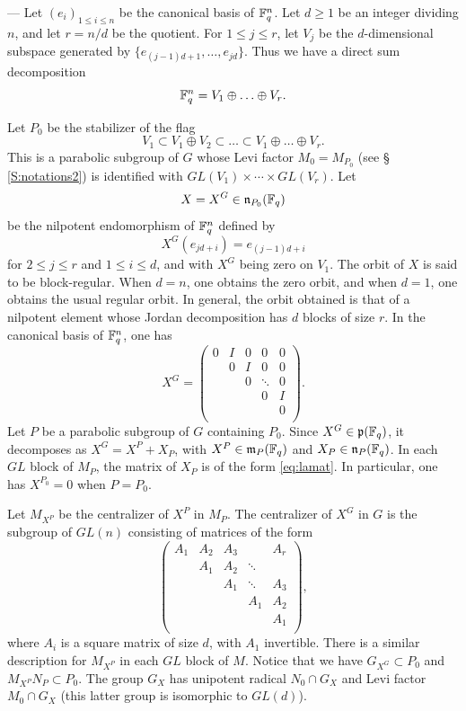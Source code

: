 \begin{paragr} ---\label{S:calculI-nota}
Let $(e_i)_{1\leq i\leq n}$ be the canonical basis of $\mathbb{F}_q^n$. Let $d\geq 1$ be an integer dividing $n$, and let $r=n/d$ be the quotient. For $1\leq j\leq r$, let $V_j$ be the $d$-dimensional subspace generated by $\{e_{(j-1)d+1},\ldots, e_{jd}\}$. Thus we have a direct sum decomposition
$$\mathbb{F}_q^n=V_1\oplus\ldots \oplus V_r.$$

Let $P_0$ be the stabilizer of the flag
$$V_1\subset V_1\oplus V_2\subset \ldots\subset V_1\oplus\ldots\oplus V_r.$$
This is a parabolic subgroup of $G$ whose Levi factor $M_0=M_{P_0}$ (see \S\,\ref{S:notations2}) is identified with $GL(V_1)\times \cdots \times GL(V_r)$.  
Let
$$X=X^G\in \mathfrak{n}_{P_0}(\mathbb{F}_q)$$
be the nilpotent endomorphism of $\mathbb{F}_q^n$ defined by
$$X^G(e_{jd+i})=e_{(j-1)d+i}$$
for $2\leq j\leq r$ and $1\leq i \leq d$, and with $X^G$ being zero on $V_1$. The orbit of $X$ is said to be \og block-regular\fg{}. When $d=n$, one obtains the zero orbit, and when $d=1$, one obtains the usual regular orbit. In general, the orbit obtained is that of a nilpotent element whose Jordan decomposition has $d$ blocks of size $r$. In the canonical basis of $\mathbb{F}_q^n$, one has
\begin{equation}
  \label{eq:lamat}
  X^G=\left(
\begin{array}{ccccc}
  0 & I & 0 &0 & 0\\
  &0 & I & 0 & 0\\
  & &  0 & \ddots & 0\\
  & & & 0 & I\\
  & &  &  & 0\\
\end{array}\right).
\end{equation}
Let $P$ be a parabolic subgroup of $G$ containing $P_0$. Since $X^G\in \mathfrak{p}(\mathbb{F}_q)$, it decomposes as $X^G=X^P+X_P$, with $X^P\in \mathfrak{m}_P(\mathbb{F}_q)$ and $X_P\in \mathfrak{n}_P(\mathbb{F}_q)$. In each $GL$ block of $M_P$, the matrix of $X_P$ is of the form \eqref{eq:lamat}. In particular, one has $X^{P_0}=0$ when $P=P_0$. 

Let $M_{X^P}$ be the centralizer of $X^P$ in $M_P$. The centralizer of $X^G$ in $G$ is the subgroup of $GL(n)$ consisting of matrices of the form
\begin{equation}
  \label{eq:lamat2}
  \left(
\begin{array}{ccccc}
  A_1 & A_2 & A_3 &  & A_r\\
  &A_1  & A_2 & \ddots & \\
  & &  A_1 & \ddots & A_3\\
  & & & A_1& A_2\\ 
  & &  &  & A_1\\
\end{array}\right),
\end{equation}
where $A_i$ is a square matrix of size $d$, with $A_1$ invertible. There is a similar description for $M_{X^P}$ in each $GL$ block of $M$. Notice that we have $G_{X^G}\subset P_0$ and $M_{X^P}N_P\subset P_0$. The group $G_X$ has unipotent radical $N_0\cap G_X$ and Levi factor $M_0\cap G_X$ (this latter group is isomorphic to $GL(d)$).
\end{paragr}

